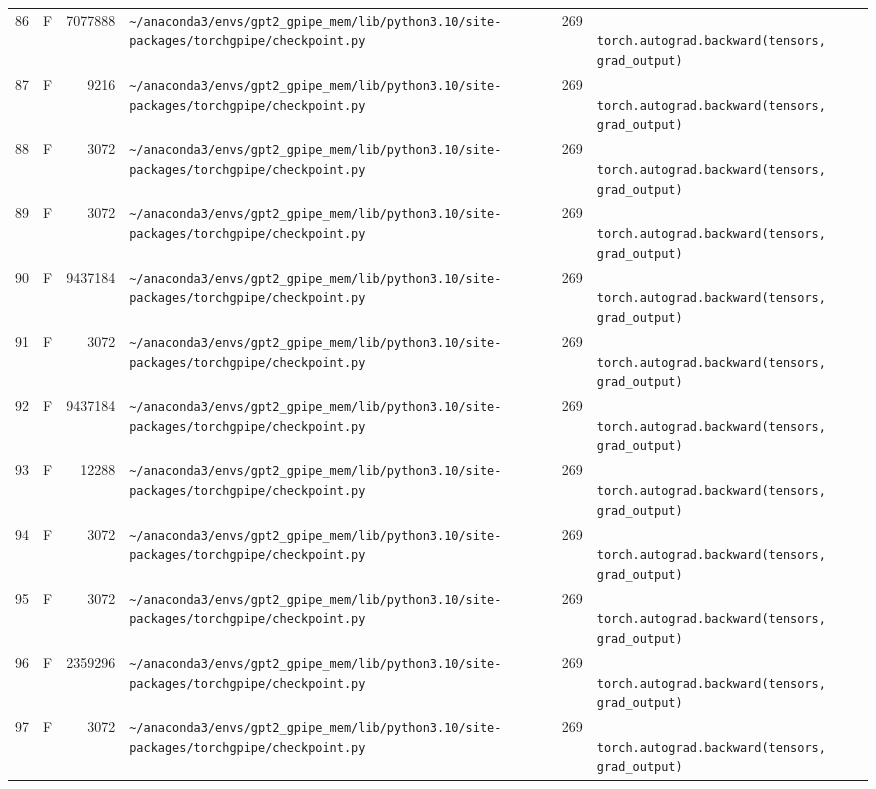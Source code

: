 \documentclass{article}
\begin{document}
\begin{longtable}{r l r p{6.5cm} r p{7.0cm}}
86 & F & 7077888 & \lstinline|~/anaconda3/envs/gpt2_gpipe_mem/lib/python3.10/site-packages/torchgpipe/checkpoint.py| & 269 & \lstinline|            torch.autograd.backward(tensors, grad_output)| \\
87 & F & 9216 & \lstinline|~/anaconda3/envs/gpt2_gpipe_mem/lib/python3.10/site-packages/torchgpipe/checkpoint.py| & 269 & \lstinline|            torch.autograd.backward(tensors, grad_output)| \\
88 & F & 3072 & \lstinline|~/anaconda3/envs/gpt2_gpipe_mem/lib/python3.10/site-packages/torchgpipe/checkpoint.py| & 269 & \lstinline|            torch.autograd.backward(tensors, grad_output)| \\
89 & F & 3072 & \lstinline|~/anaconda3/envs/gpt2_gpipe_mem/lib/python3.10/site-packages/torchgpipe/checkpoint.py| & 269 & \lstinline|            torch.autograd.backward(tensors, grad_output)| \\
90 & F & 9437184 & \lstinline|~/anaconda3/envs/gpt2_gpipe_mem/lib/python3.10/site-packages/torchgpipe/checkpoint.py| & 269 & \lstinline|            torch.autograd.backward(tensors, grad_output)| \\
91 & F & 3072 & \lstinline|~/anaconda3/envs/gpt2_gpipe_mem/lib/python3.10/site-packages/torchgpipe/checkpoint.py| & 269 & \lstinline|            torch.autograd.backward(tensors, grad_output)| \\
92 & F & 9437184 & \lstinline|~/anaconda3/envs/gpt2_gpipe_mem/lib/python3.10/site-packages/torchgpipe/checkpoint.py| & 269 & \lstinline|            torch.autograd.backward(tensors, grad_output)| \\
93 & F & 12288 & \lstinline|~/anaconda3/envs/gpt2_gpipe_mem/lib/python3.10/site-packages/torchgpipe/checkpoint.py| & 269 & \lstinline|            torch.autograd.backward(tensors, grad_output)| \\
94 & F & 3072 & \lstinline|~/anaconda3/envs/gpt2_gpipe_mem/lib/python3.10/site-packages/torchgpipe/checkpoint.py| & 269 & \lstinline|            torch.autograd.backward(tensors, grad_output)| \\
95 & F & 3072 & \lstinline|~/anaconda3/envs/gpt2_gpipe_mem/lib/python3.10/site-packages/torchgpipe/checkpoint.py| & 269 & \lstinline|            torch.autograd.backward(tensors, grad_output)| \\
96 & F & 2359296 & \lstinline|~/anaconda3/envs/gpt2_gpipe_mem/lib/python3.10/site-packages/torchgpipe/checkpoint.py| & 269 & \lstinline|            torch.autograd.backward(tensors, grad_output)| \\
97 & F & 3072 & \lstinline|~/anaconda3/envs/gpt2_gpipe_mem/lib/python3.10/site-packages/torchgpipe/checkpoint.py| & 269 & \lstinline|            torch.autograd.backward(tensors, grad_output)| \\

\end{longtable}
\end{document}
